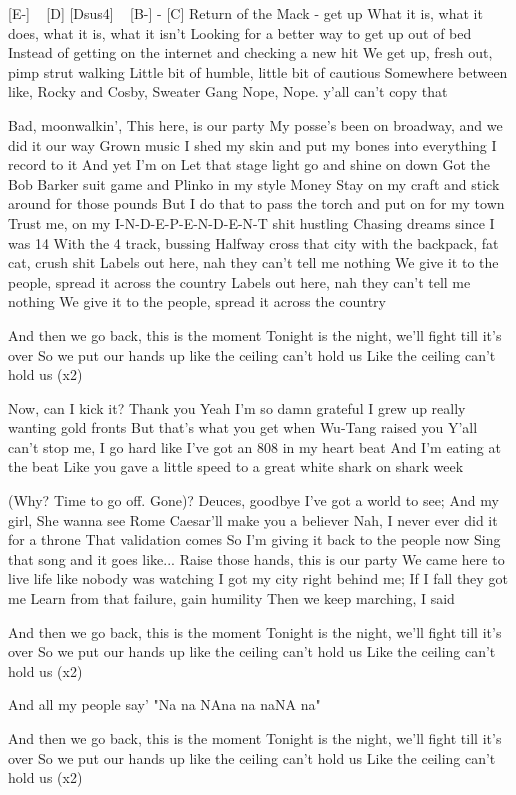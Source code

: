 
[E-] ~ [D] [Dsus4] ~ [B-] - [C]
Return of the Mack - get up
What it is, what it does, what it is, what it isn’t
Looking for a better way to get up out of bed
Instead of getting on the internet and checking a new hit
We get up, fresh out, pimp strut walking
Little bit of humble, little bit of cautious
Somewhere between like, Rocky and Cosby, Sweater Gang
Nope, Nope. y’all can’t copy that

Bad, moonwalkin', This here, is our party
My posse's been on broadway, and we did it our way
Grown music
I shed my skin and put my bones into everything I record to it
And yet I’m on
Let that stage light go and shine on down
Got the Bob Barker suit game and Plinko in my style
Money
Stay on my craft and stick around for those pounds
But I do that to pass the torch and put on for my town
Trust me, on my I-N-D-E-P-E-N-D-E-N-T shit hustling
Chasing dreams since I was 14
With the 4 track, bussing
Halfway cross that city with the backpack, fat cat, crush shit
Labels out here, nah they can’t tell me nothing
We give it to the people, spread it across the country
Labels out here, nah they can’t tell me nothing
We give it to the people, spread it across the country


And then we go back, this is the moment
Tonight is the night, we’ll fight till it’s over
So we put our hands up like the ceiling can’t hold us
Like the ceiling can’t hold us
(x2)


Now, can I kick it? Thank you
Yeah I’m so damn grateful
I grew up really wanting gold fronts
But that’s what you get when Wu-Tang raised you
Y’all can’t stop me, I go hard like I've got an 808 in my heart beat
And I’m eating at the beat
Like you gave a little speed to a great white shark on shark week

(Why? Time to go off. Gone)? Deuces, goodbye
I've got a world to see;
And my girl, She wanna see Rome
Caesar'll make you a believer
Nah, I never ever did it for a throne
That validation comes
So I'm giving it back to the people now
Sing that song and it goes like...
Raise those hands, this is our party
We came here to live life like nobody was watching
I got my city right behind me;
If I fall they got me
Learn from that failure, gain humility
Then we keep marching, I said


And then we go back, this is the moment
Tonight is the night, we’ll fight till it’s over
So we put our hands up like the ceiling can’t hold us
Like the ceiling can’t hold us
(x2)

And all my people say'
"Na na NAna na naNA na"

And then we go back, this is the moment
Tonight is the night, we’ll fight till it’s over
So we put our hands up like the ceiling can’t hold us
Like the ceiling can’t hold us
(x2) 